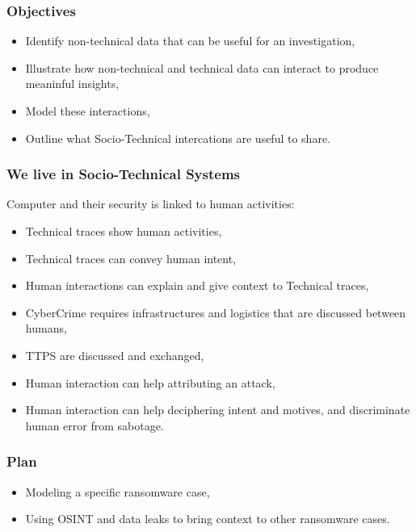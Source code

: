 
\begin{frame}[t,plain]
\titlepage
\end{frame}

\begin{frame}
    \frametitle{Objectives}
    \begin{itemize}
        \item Identify non-technical data that can be useful for an investigation,
        \item Illustrate how non-technical and technical data can interact to produce meaninful insights,
        \item Model these interactions,
        \item Outline what Socio-Technical intercations are useful to share.
    \end{itemize}

\end{frame}


\begin{frame}
	\frametitle{We live in Socio-Technical Systems}

    Computer and their security is linked to human activities:

    \begin{itemize}
        \item Technical traces show human activities,
        \item Technical traces can convey human intent,
        \item Human interactions can explain and give context to Technical traces,
        \item CyberCrime requires infrastructures and logistics that are discussed between humans,
	\item TTPS are discussed and exchanged,
	\item Human interaction can help attributing an attack,
	\item Human interaction can help deciphering intent and motives, and discriminate human error from sabotage.
    \end{itemize}

\end{frame}


\begin{frame}
	\frametitle{Plan}
    \begin{itemize}
        \item Modeling a specific ransomware case,
        \item Using OSINT and data leaks to bring context to other ransomware cases.
    \end{itemize}

\end{frame}

